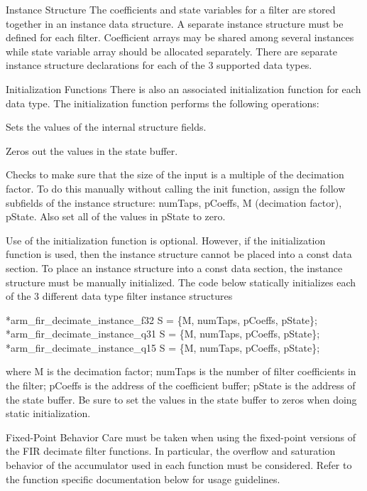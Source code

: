 \begin{DoxyParagraph}{Instance Structure}
The coefficients and state variables for a filter are stored together in an instance data structure. A separate instance structure must be defined for each filter. Coefficient arrays may be shared among several instances while state variable array should be allocated separately. There are separate instance structure declarations for each of the 3 supported data types.
\end{DoxyParagraph}
\begin{DoxyParagraph}{Initialization Functions}
There is also an associated initialization function for each data type. The initialization function performs the following operations\+:
\begin{DoxyItemize}
\item Sets the values of the internal structure fields.
\item Zeros out the values in the state buffer.
\item Checks to make sure that the size of the input is a multiple of the decimation factor. To do this manually without calling the init function, assign the follow subfields of the instance structure\+: num\+Taps, p\+Coeffs, M (decimation factor), p\+State. Also set all of the values in p\+State to zero.
\end{DoxyItemize}
\end{DoxyParagraph}
\begin{DoxyParagraph}{}
Use of the initialization function is optional. However, if the initialization function is used, then the instance structure cannot be placed into a const data section. To place an instance structure into a const data section, the instance structure must be manually initialized. The code below statically initializes each of the 3 different data type filter instance structures 
\begin{DoxyPre}
*arm\_fir\_decimate\_instance\_f32 S = \{M, numTaps, pCoeffs, pState\};
*arm\_fir\_decimate\_instance\_q31 S = \{M, numTaps, pCoeffs, pState\};
*arm\_fir\_decimate\_instance\_q15 S = \{M, numTaps, pCoeffs, pState\};
  \end{DoxyPre}
 where {\ttfamily M} is the decimation factor; {\ttfamily num\+Taps} is the number of filter coefficients in the filter; {\ttfamily p\+Coeffs} is the address of the coefficient buffer; {\ttfamily p\+State} is the address of the state buffer. Be sure to set the values in the state buffer to zeros when doing static initialization.
\end{DoxyParagraph}
\begin{DoxyParagraph}{Fixed-\/\+Point Behavior}
Care must be taken when using the fixed-\/point versions of the F\+IR decimate filter functions. In particular, the overflow and saturation behavior of the accumulator used in each function must be considered. Refer to the function specific documentation below for usage guidelines. 
\end{DoxyParagraph}


